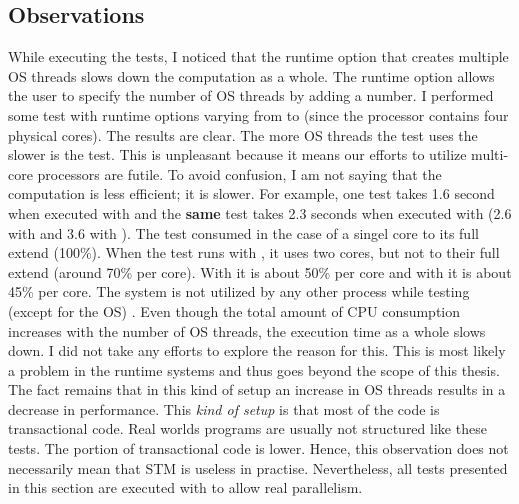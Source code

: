 \subsection{Observations}
While executing the tests, I noticed that the runtime option  that creates multiple OS threads slows down the 
computation as a whole. The runtime option  allows the user to specify the number of OS threads by adding a 
number. I performed some test with runtime options varying from  to  (since the processor contains four 
physical cores). The results are clear. The more OS threads the test uses the slower is the test. This is unpleasant 
because it means our efforts to utilize multi-core processors are futile. To avoid confusion, I am not saying that 
the computation is less efficient; it is slower. For example, one test takes 1.6 second when executed with 
and the \textbf{same} test takes 2.3 seconds when executed with  (2.6 with  and 3.6 with ).
The test consumed in the case of  a singel core to its full extend (100\%). When the test runs with ,
it uses two cores, but not to their full extend (around 70\% per core). With  it is about 50\% per core and 
with  it is about 45\% per core. The system is not utilized by any other process while testing (except for the 
OS) . Even though the total amount of CPU consumption increases with the number of OS threads, the execution time 
as a whole slows down. I did not take any efforts to explore the reason for this. This is most likely a problem 
in the runtime systems and thus goes beyond the scope of this thesis. The fact remains that in this kind of
setup an increase in OS threads results in a decrease in performance. This \textit{kind of setup} is that most of 
the code is transactional code. Real worlds programs are usually not structured like these tests. The portion
of transactional code is lower. Hence, this observation does not necessarily mean that STM is useless in 
practise. Nevertheless, all tests presented in this section are executed with  to allow real parallelism. 

